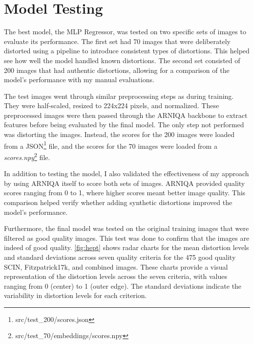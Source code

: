 \section{Model Testing}
\label{sec:ModelTesting}
The best model, the MLP Regressor, was tested on two specific sets of images to evaluate its performance. The first set had 70 images that were deliberately distorted using a pipeline to introduce consistent types of distortions. This helped see how well the model handled known distortions. The second set consisted of 200 images that had authentic distortions, allowing for a comparison of the model’s performance with my manual evaluations.\par
\vspace{\baselineskip}
\noindent
The test images went through similar preprocessing steps as during training. They were half-scaled, resized to 224x224 pixels, and normalized. These preprocessed images were then passed through the ARNIQA backbone to extract features before being evaluated by the final model. The only step not performed was distorting the images. Instead, the scores for the 200 images were loaded from a JSON\footnote{src/test\_200/scores.json} file, and the scores for the 70 images were loaded from a \textit{scores.npy}\footnote{src/test\_70/embeddings/scores.npy} file. \par
\vspace{\baselineskip}
\noindent
In addition to testing the model, I also validated the effectiveness of my approach by using ARNIQA itself to score both sets of images. ARNIQA provided quality scores ranging from 0 to 1, where higher scores meant better image quality. This comparison helped verify whether adding  synthetic distortions improved the model’s performance. \par
\vspace{\baselineskip}
\noindent
Furthermore, the final model was tested on the original training images that were filtered as good quality images. This test was done to confirm that the images are indeed of good quality. \autoref{fig:hept} shows radar charts for the mean distortion levels and standard deviations across seven quality criteria for the 475 good quality SCIN, Fitzpatrick17k, and combined images. These charts provide a visual representation of the distortion levels across the seven criteria, with values ranging from 0 (center) to 1 (outer edge). The standard deviations indicate the variability in distortion levels for each criterion. \par
\vspace{\baselineskip}
